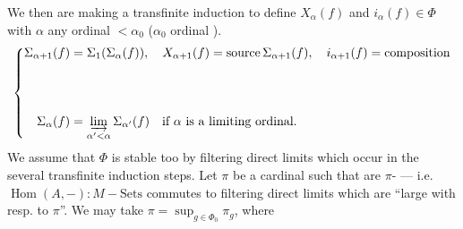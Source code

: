 We then are making a transfinite induction to define $X_\alpha(f)$ and
$i_\alpha(f)\in\Phi$
with $\alpha$ any ordinal \deleted{$\unsure{\Phi}$} $<\alpha_0$ ($\alpha_0$  ordinal    ).
\[
\left\{\begin{aligned}
\Sigma_{\alpha+1}(f)&=\Sigma_1(\Sigma_\alpha(f)),\quad X_{\alpha+1}(f)=\text{source}\,\Sigma_{\alpha+1}(f),\quad i_{\alpha+1}(f)=\text{composition}\\[4em]
\Sigma_\alpha(f)&=\varinjlim_{\alpha'<\alpha}\Sigma_{\alpha'}(f)\quad\text{if $\alpha$ is a limiting ordinal.}
\end{aligned}\right.
\]
 We assume that $\Phi$ is stable too by  filtering direct limits  which occur in the several transfinite induction steps.
Let $\pi$ be a cardinal such that   are $\pi$-
--- i.e. $\operatorname{Hom}(A,-):M-\mathrm{Sets}$ commutes to filtering direct limits which are  ``large with resp. to $\pi$''. We may take $\pi=\sup_{g\in\Phi_0}\pi_g$, where

